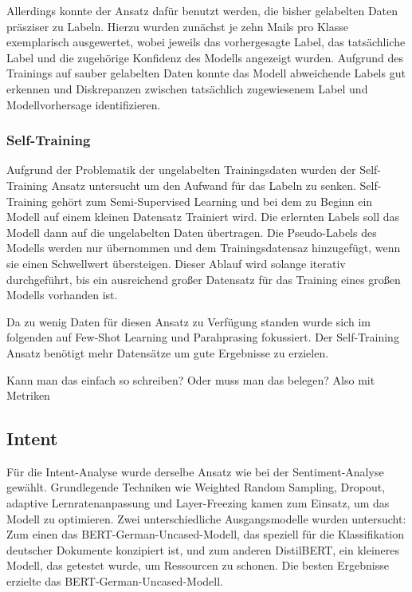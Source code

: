 Allerdings konnte der Ansatz dafür benutzt werden, die bisher gelabelten Daten präsziser zu
Labeln. Hierzu wurden zunächst je zehn Mails pro Klasse exemplarisch ausgewertet, wobei jeweils
das vorhergesagte Label, das tatsächliche Label und die zugehörige Konfidenz des Modells
angezeigt wurden. Aufgrund des Trainings auf sauber gelabelten Daten konnte das Modell
abweichende Labels gut erkennen und Diskrepanzen zwischen tatsächlich zugewiesenem Label und
Modellvorhersage identifizieren. 


\subsubsection{Self-Training}
Aufgrund der Problematik der ungelabelten Trainingsdaten wurden der Self-Training Ansatz
untersucht um den Aufwand für das Labeln zu senken. Self-Training gehört zum Semi-Supervised
Learning und bei dem zu Beginn ein Modell auf einem kleinen Datensatz Trainiert wird. Die
erlernten Labels soll das Modell dann auf die ungelabelten Daten übertragen. Die Pseudo-Labels
des Modells werden nur übernommen und dem Trainingsdatensaz hinzugefügt, wenn sie einen
Schwellwert übersteigen. Dieser Ablauf wird solange iterativ durchgeführt, bis ein ausreichend
großer Datensatz für das Training eines großen Modells vorhanden ist.  

Da zu wenig Daten für diesen Ansatz zu Verfügung standen wurde sich im folgenden auf Few-Shot
Learning und Parahprasing fokussiert. Der Self-Training Ansatz benötigt mehr Datensätze um
gute Ergebnisse zu erzielen.  

 

Kann man das einfach so schreiben? Oder muss man das belegen? Also mit Metriken



\subsection{Intent} 
Für die Intent-Analyse wurde derselbe Ansatz wie bei der Sentiment-Analyse gewählt. Grundlegende Techniken wie Weighted Random Sampling, Dropout, adaptive Lernratenanpassung und Layer-Freezing kamen zum Einsatz, um das Modell zu optimieren. Zwei unterschiedliche Ausgangsmodelle wurden untersucht: Zum einen das BERT-German-Uncased-Modell, das speziell für die Klassifikation deutscher Dokumente konzipiert ist, und zum anderen DistilBERT, ein kleineres Modell, das getestet wurde, um Ressourcen zu schonen. Die besten Ergebnisse erzielte das BERT-German-Uncased-Modell.

